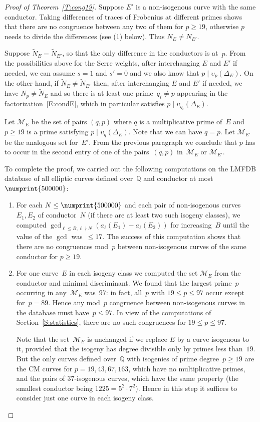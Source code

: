 \documentclass[12pt, reqno]{amsart}
\newcommand{\Q}{\mathbb{Q}}
\newcommand{\calM}{\mathcal{M}}
\newcommand{\vv}{\upsilon}
\numberwithin{equation}{section}
\theoremstyle{definition}
\theoremstyle{remark}
\begin{document}
\begin{proof}[Proof of Theorem~\ref{T:cong19}]
Suppose $E'$ is a non-isogenous curve with the same conductor. Taking differences of traces of Frobenius at different primes shows that 
there are no congruence between any two of them for $p \geq 19$, otherwise $p$ needs to divide the differences (see (1) below). 
Thus $N_E \neq N_{E'}$.

Suppose $\tilde{N}_E = \tilde{N}_{E'}$, so that the only difference in the conductors is at~$p$. From the possibilities above for the Serre weights, after interchanging $E$ and $E'$ if needed, 
we can assume $s=1$ and $s'=0$ and we also know that $p \mid \vv_p(\Delta_E)$. On the other hand, if $\tilde{N}_E \neq \tilde{N}_{E'}$ then, after interchanging $E$ and $E'$ if needed, we have $N_p \neq \tilde{N}_E$ and so there is at least one prime~$q_i \neq p$ appearing in the factorization~\eqref{E:condE}, which in particular satisfies $p \mid \vv_{q_i}(\Delta_E)$.

Let $\calM_E$ be the set of pairs $(q,p)$ where $q$ is a multiplicative prime of~$E$ and
$p \geq 19$ is a prime satisfying $p \mid \vv_{q}(\Delta_E)$.
Note that we can have $q=p$. Let $\calM_{E'}$ be the analogous set for~$E'$. From the previous paragraph we conclude that 
$p$ has to occur in the second entry of one of the pairs~$(q,p)$ in~$\calM_E$ or $\calM_{E'}$.

To complete the proof, we carried out the following computations on
the LMFDB database of all elliptic curves defined over~$\Q$ and
conductor at most~$\numprint{500000}$:
\begin{enumerate}
\item For each $N\le \numprint{500000}$ and each pair of non-isogenous
  curves~$E_1,E_2$ of conductor~$N$ (if there are at least two such
  isogeny classes), we computed $\gcd_{\ell\le B,
    \ell\nmid N}(a_{\ell}(E_1)-a_{\ell}(E_2))$ for increasing~$B$
  until the value of the $\gcd$ was~${}\le17$.  The success of this
  computation shows that there are no congruences mod~$p$ between
  non-isogenous curves of the same conductor for $p\ge19$.
\item For one curve~$E$ in each isogeny class we computed the set
  $\calM_E$ from the conductor and minimal discriminant.  We found that
  the largest prime~$p$ occurring in any~$\calM_E$ was~$97$: in fact,
  all~$p$ with $19\le p\le97$ occur except for~$p=89$.  Hence any
  mod~$p$ congruence between non-isogenous curves in the database must
  have~$p\le97$.  In view of the computations of
  Section~\ref{S:statistics}, there are no such congruences for $19\le
  p\le97$.

  Note that the set~$\calM_E$ is unchanged if we replace $E$ by a curve
  isogenous to it, provided that the isogeny has degree divisible only
  by primes less than~$19$.  But the only curves defined over~$\Q$ with
  isogenies of prime degree~$p\ge19$ are the CM curves for
  $p=19,43,67,163$, which have no multiplicative primes, and the pairs
  of $37$-isogenous curves, which have the same property (the smallest
  conductor being $1225=5^2\cdot7^2$).  Hence in this step it suffices
  to consider just one curve in each isogeny class.
\end{enumerate}
\end{proof}
\end{document}
